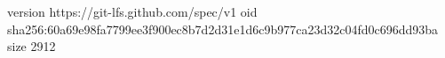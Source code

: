 version https://git-lfs.github.com/spec/v1
oid sha256:60a69e98fa7799ee3f900ec8b7d2d31e1d6c9b977ca23d32c04fd0c696dd93ba
size 2912
